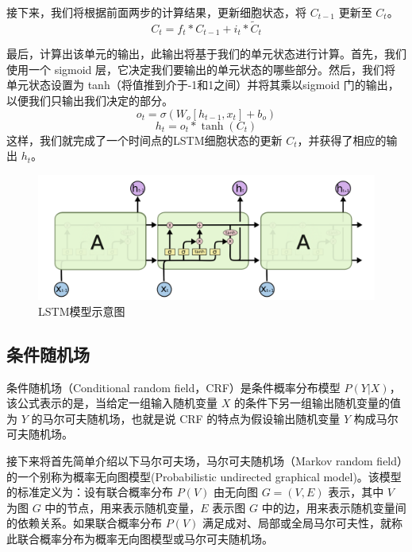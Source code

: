 接下来，我们将根据前面两步的计算结果，更新细胞状态，将 $C_{t-1}$ 更新至 $C_{t}$。
\begin{equation}
C_{t}=f_{t} * C_{t-1}+i_{t} * \tilde{C}_{t}
\end{equation}

最后，计算出该单元的输出，此输出将基于我们的单元状态进行计算。首先，我们使用一个 sigmoid 层，它决定我们要输出的单元状态的哪些部分。然后，我们将单元状态设置为 tanh（将值推到介于-1和1之间）并将其乘以sigmoid 门的输出，以便我们只输出我们决定的部分。
\begin{equation}
o_{t}=\sigma\left(W_{o}\left[h_{t-1}, x_{t}\right]+b_{o}\right)
\end{equation}
\begin{equation}
h_{t}=o_{t} * \tanh \left(C_{t}\right)
\end{equation}
这样，我们就完成了一个时间点的LSTM细胞状态的更新 $C_{t}$，并获得了相应的输出 $h_{t}$。


\begin{figure}[ht]
	\centering
	\includegraphics[width=\linewidth]{figures/LSTM.png}
	\caption{LSTM模型示意图}
    \label{fig:LSTM}
\end{figure}



\subsection{条件随机场}
条件随机场（Conditional random field，CRF）是条件概率分布模型 $P(Y|X)$，该公式表示的是，当给定一组输入随机变量 $X$ 的条件下另一组输出随机变量的值为 $Y$ 的马尔可夫随机场，也就是说 CRF 的特点为假设输出随机变量 $Y$ 构成马尔可夫随机场。

接下来将首先简单介绍以下马尔可夫场，马尔可夫随机场（Markov random field）的一个别称为概率无向图模型(Probabilistic undirected graphical model)。该模型的标准定义为：设有联合概率分布 $P(V)$ 由无向图 $G=(V, E)$ 表示，其中 $V$ 为图 $G$ 中的节点，用来表示随机变量，$E$ 表示图 $G$ 中的边，用来表示随机变量间的依赖关系。如果联合概率分布 $P(V)$ 满足成对、局部或全局马尔可夫性，就称此联合概率分布为概率无向图模型或马尔可夫随机场。


